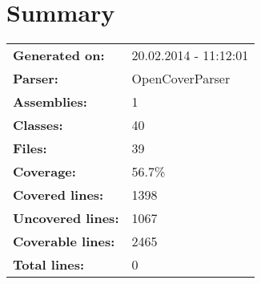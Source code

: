 \documentclass[a4paper,10pt]{article}
\begin{document}
\setcounter{secnumdepth}{-1}
\section{Summary}
\begin{longtable}[l]{ll}
\textbf{Generated on:} & 20.02.2014 - 11:12:01\\
\textbf{Parser:} & OpenCoverParser\\
\textbf{Assemblies:} & 1\\
\textbf{Classes:} & 40\\
\textbf{Files:} & 39\\
\textbf{Coverage:} & 56.7\%\\
\textbf{Covered lines:} & 1398\\
\textbf{Uncovered lines:} & 1067\\
\textbf{Coverable lines:} & 2465\\
\textbf{Total lines:} & 0\\
\end{longtable}
\end{document}

